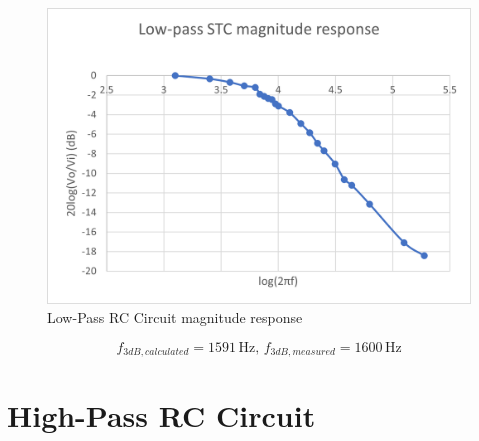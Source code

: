 \documentclass{article}
\begin{document}
\begin{CJK*}{UTF8}{bkai}
\begin{minipage}{0.5\textwidth}
\begin{figure}[H]
    \includegraphics[scale=0.65]{lowpassstc.jpg.png}
    \caption{Low-Pass RC Circuit magnitude response}
\end{figure}
\end{minipage}
\begin{equation*}
    f_{3dB,calculated} = 1591 \,\unit{\hertz},\,f_{3dB,measured} = 1600\,\unit{\hertz}
\end{equation*}

\section*{High-Pass RC Circuit}


\end{CJK*}
\end{document}
